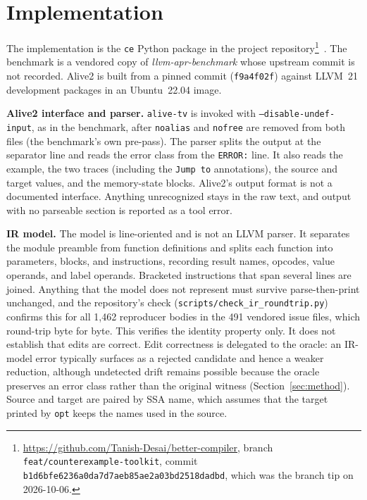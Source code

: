 \documentclass[conference]{IEEEtran}
\begin{document}
\section{Implementation}
\label{sec:impl}

The implementation is the \texttt{ce} Python package in the project repository\footnote{\url{https://github.com/Tanish-Desai/better-compiler}, branch \texttt{feat/counterexample-toolkit}, commit \texttt{b1d6bfe6236a0da7d7aeb85ae2a03bd2518dadbd}, which was the branch tip on 2026-10-06.}~\cite{betterCompiler2026}. The benchmark is a vendored copy of \emph{llvm-apr-benchmark} whose upstream commit is not recorded. Alive2 is built from a pinned commit (\texttt{f9a4f02f}) against LLVM~21 development packages in an Ubuntu~22.04 image.

\textbf{Alive2 interface and parser.} \texttt{alive-tv} is invoked with \texttt{--disable-undef-input}, as in the benchmark, after \texttt{noalias} and \texttt{nofree} are removed from both files (the benchmark's own pre-pass). The parser splits the output at the separator line and reads the error class from the \texttt{ERROR:} line. It also reads the example, the two traces (including the \texttt{Jump to} annotations), the source and target values, and the memory-state blocks. Alive2's output format is not a documented interface. Anything unrecognized stays in the raw text, and output with no parseable section is reported as a tool error.

\textbf{IR model.} The model is line-oriented and is not an LLVM parser. It separates the module preamble from function definitions and splits each function into parameters, blocks, and instructions, recording result names, opcodes, value operands, and label operands. Bracketed instructions that span several lines are joined. Anything that the model does not represent must survive parse-then-print unchanged, and the repository's check (\texttt{scripts/check\_ir\_roundtrip.py}) confirms this for all 1{,}462 reproducer bodies in the 491 vendored issue files, which round-trip byte for byte. This verifies the identity property only. It does not establish that edits are correct. Edit correctness is delegated to the oracle: an IR-model error typically surfaces as a rejected candidate and hence a weaker reduction, although undetected drift remains possible because the oracle preserves an error class rather than the original witness (Section~\ref{sec:method}). Source and target are paired by SSA name, which assumes that the target printed by \texttt{opt} keeps the names used in the source.
\end{document}
